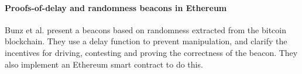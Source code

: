 \paragraph{Proofs-of-delay and randomness beacons in Ethereum}
Bunz et al. \cite{bunz2017proofsof} present a beacons based on randomness extracted from the bitcoin blockchain. They use a delay function to prevent manipulation, and clarify the incentives for driving, contesting and proving the correctness of the beacon. They also implement an Ethereum smart contract to do this.
